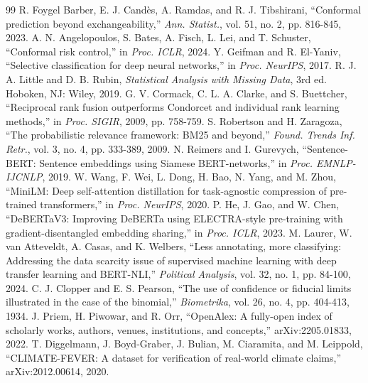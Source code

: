 \documentclass[conference,a4paper]{IEEEtran}
\theoremstyle{definition}
\begin{document}
\begin{thebibliography}{99}
 R. Foygel Barber, E. J. Cand\`es, A. Ramdas, and R. J. Tibshirani, ``Conformal prediction beyond exchangeability,'' \emph{Ann. Statist.}, vol. 51, no. 2, pp. 816-845, 2023.
 A. N. Angelopoulos, S. Bates, A. Fisch, L. Lei, and T. Schuster, ``Conformal risk control,'' in \emph{Proc. ICLR}, 2024.
 Y. Geifman and R. El-Yaniv, ``Selective classification for deep neural networks,'' in \emph{Proc. NeurIPS}, 2017.
 R. J. A. Little and D. B. Rubin, \emph{Statistical Analysis with Missing Data}, 3rd ed. Hoboken, NJ: Wiley, 2019.
 G. V. Cormack, C. L. A. Clarke, and S. Buettcher, ``Reciprocal rank fusion outperforms Condorcet and individual rank learning methods,'' in \emph{Proc. SIGIR}, 2009, pp. 758-759.
 S. Robertson and H. Zaragoza, ``The probabilistic relevance framework: BM25 and beyond,'' \emph{Found. Trends Inf. Retr.}, vol. 3, no. 4, pp. 333-389, 2009.
 N. Reimers and I. Gurevych, ``Sentence-BERT: Sentence embeddings using Siamese BERT-networks,'' in \emph{Proc. EMNLP-IJCNLP}, 2019.
 W. Wang, F. Wei, L. Dong, H. Bao, N. Yang, and M. Zhou, ``MiniLM: Deep self-attention distillation for task-agnostic compression of pre-trained transformers,'' in \emph{Proc. NeurIPS}, 2020.
 P. He, J. Gao, and W. Chen, ``DeBERTaV3: Improving DeBERTa using ELECTRA-style pre-training with gradient-disentangled embedding sharing,'' in \emph{Proc. ICLR}, 2023.
 M. Laurer, W. van Atteveldt, A. Casas, and K. Welbers, ``Less annotating, more classifying: Addressing the data scarcity issue of supervised machine learning with deep transfer learning and BERT-NLI,'' \emph{Political Analysis}, vol. 32, no. 1, pp. 84-100, 2024.
 C. J. Clopper and E. S. Pearson, ``The use of confidence or fiducial limits illustrated in the case of the binomial,'' \emph{Biometrika}, vol. 26, no. 4, pp. 404-413, 1934.
 J. Priem, H. Piwowar, and R. Orr, ``OpenAlex: A fully-open index of scholarly works, authors, venues, institutions, and concepts,'' arXiv:2205.01833, 2022.
 T. Diggelmann, J. Boyd-Graber, J. Bulian, M. Ciaramita, and M. Leippold, ``CLIMATE-FEVER: A dataset for verification of real-world climate claims,'' arXiv:2012.00614, 2020.
\end{thebibliography}
\end{document}
